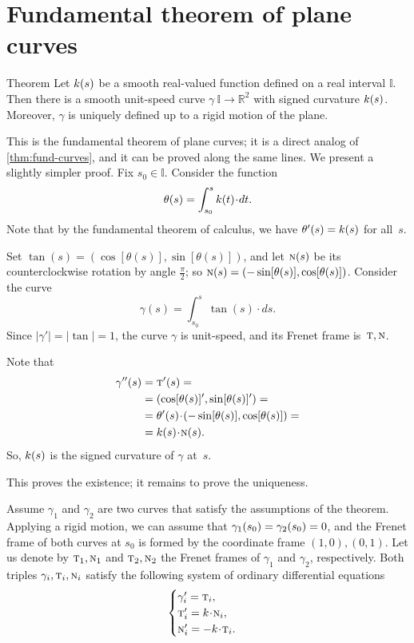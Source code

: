 \section{Fundamental theorem of plane curves}

\begin{thm}{Theorem}\label{thm:fund-curves-2D}
Let $k(s)$ be a smooth real-valued function defined on a real interval $\mathbb{I}$.
Then there is a smooth unit-speed curve $\gamma\:\mathbb{I}\to\mathbb{R}^2$ with signed curvature $k(s)$.
Moreover, $\gamma$ is uniquely defined up to a rigid motion of the plane.
\end{thm}

This is the fundamental theorem of plane curves; it is a direct analog of \ref{thm:fund-curves}, and it can be proved along the same lines.
We present a slightly simpler proof.
Fix $s_0\in\mathbb{I}$.
Consider the function
\[\theta(s)
=
\int_{s_0}^s\skur(t)\cdot dt.\]
Note that by the fundamental theorem of calculus, we have $\theta'(s)\z=\skur(s)$ for all~$s$.

Set 
$\tan(s)=(\cos[\theta(s)],\sin[\theta(s)])$,
and let $\text{\sc{n}}(s)$ be its counterclockwise rotation by angle $\tfrac\pi2$; so 
$\text{\sc{n}}(s)=(-\sin[\theta(s)],\cos[\theta(s)])$.
Consider the curve 
\[\gamma(s)=\int_{s_0}^s\tan(s)\cdot ds.\]
Since $|\gamma'|=|\tan|=1$, the curve $\gamma$ is unit-speed, and its Frenet frame is~$\text{\sc{t}},\text{\sc{n}}$. 

Note that
\begin{align*}
\gamma''(s)&=\tan'(s)=
\\
&=(\cos[\theta(s)]',\sin[\theta(s)]')=
\\
&=\theta'(s)\cdot (-\sin[\theta(s)],\cos[\theta(s)])=
\\
&=\skur(s)\cdot \norm(s).
\end{align*}
So, $k(s)$ is the signed curvature of $\gamma$ at~$s$. 

This proves the existence;
it remains to prove the uniqueness.

Assume $\gamma_1$ and $\gamma_2$ are two curves that satisfy the assumptions of the theorem.
Applying a rigid motion, we can assume that $\gamma_1(s_0)\z=\gamma_2(s_0)\z=0$, and the Frenet frame of both curves at $s_0$ is formed by the coordinate frame $(1,0),(0,1)$.
Let us denote by $\text{\sc{t}}_1,\text{\sc{n}}_1$ and $\text{\sc{t}}_2,\text{\sc{n}}_2$ the Frenet frames of $\gamma_1$ and $\gamma_2$, respectively.
Both triples $\gamma_i,\text{\sc{t}}_i,\text{\sc{n}}_i$ satisfy the following system of ordinary differential equations 
\[
\begin{cases}
\gamma_i'=\tan_i,
\\
\tan_i'=\skur\cdot\norm_i,
\\
\norm_i'=-\skur\cdot\tan_i.
\end{cases}
\]

